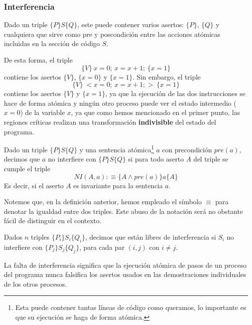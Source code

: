 \subsubsection{Interferencia}
Dado un triple $\{P\}S\{Q\}$, este puede contener varios asertos: $\{P\}$, $\{Q\}$ y cualquiera que sirve como pre y poscondición entre las acciones atómicas incluidas en la sección de código $S$.
\begin{ejemplo}
    De esta forma, el triple 
    \begin{equation*}
        \{V\}\ x=0;\ x=x+1;\ \{x=1\} 
    \end{equation*}
    contiene los asertos $\{V\}$, $\{x=0\}$ y $\{x=1\}$. Sin embargo, el triple 
    \begin{equation*}
        \{V\}\ <x=0;\ x=x+1;>\ \{x=1\}
    \end{equation*}
    contiene los asertos $\{V\}$ y $\{x=1\}$, ya que la ejecución de las dos instrucciones se hace de forma atómica y ningún otro proceso puede ver el estado intermedio ($x=0$) de la variable $x$, ya que como hemos mencionado en el primer punto, las regiones críticas realizan una transformación \textbf{indivisible} del estado del programa.
\end{ejemplo}
\begin{definicion}[Interferencia]
    Dado un triple $\{P\}S\{Q\}$ y una sentencia atómica\footnote{Esta puede contener tantas líneas de código como queramos, lo importante es que su ejecución se haga de forma atómica.} $a$ con precondición $pre(a)$, decimos que $a$ no interfiere con $\{P\}S\{Q\}$ si para todo aserto $A$ del triple se cumple el triple
    \begin{equation*}
        NI(A, a) :\equiv \{A \land pre(a)\} a \{A\}
    \end{equation*}
    Es decir, si el aserto $A$ es invariante para la sentencia $a$.
\end{definicion}
\begin{observacion}
    Notemos que, en la definición anterior, hemos empleado el símbolo $\equiv$ para denotar la igualdad entre dos triples.
    Este abuso de la notación será no obstante fácil de distinguir en el contexto.
\end{observacion}
\begin{definicion}
    Dados $n$ triples $\{P_i\}S_i\{Q_i\}$, decimos que están libres de interferencia si $S_i$ no interfiere con $\{P_j\}S_j\{Q_j\}$, para cada par $(i,j)$ con $i\neq j$.
\end{definicion}
La falta de interferencia significa que la ejecución atómica de pasos de un proceso del programa nunca falsifica los asertos usados en las demostraciones individuales de los otros procesos.

